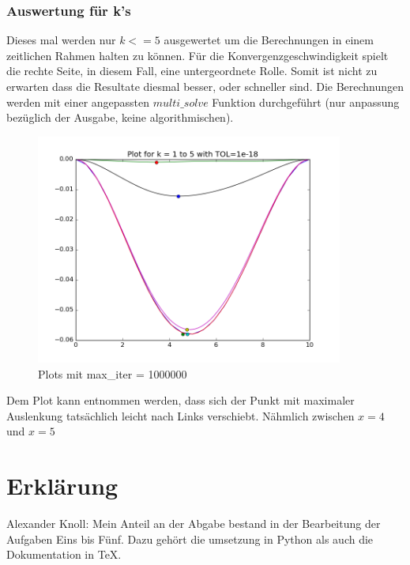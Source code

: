 \documentclass[12pt,titlepage]{article}
\begin{document}
	 	\subsubsection{Auswertung für k's}
	 		Dieses mal werden nur $k<=5$ ausgewertet um die Berechnungen in einem zeitlichen Rahmen halten zu können. Für die Konvergenzgeschwindigkeit spielt die rechte Seite, 
	 		in diesem Fall, eine untergeordnete Rolle. Somit ist nicht zu erwarten dass die Resultate diesmal besser, oder schneller sind. Die Berechnungen werden mit einer
	 		angepassten $multi\_solve$ Funktion durchgeführt (nur anpassung bezüglich der Ausgabe, keine algorithmischen).
		\begin{figure}[H] 
	 		\centering
	 		\includegraphics[width=0.9\textwidth]{extra_k.png}
	 		\caption{Plots mit max\_iter = 1000000}
	 		\label{fig:Bild6}
	 	\end{figure}
	 	Dem Plot kann entnommen werden, dass sich der Punkt mit maximaler Auslenkung tatsächlich leicht nach Links verschiebt. Nähmlich zwischen $x=4$ und $x=5$

\newpage
\section{Erklärung}
	Alexander Knoll: Mein Anteil an der Abgabe bestand in der Bearbeitung der Aufgaben Eins bis Fünf. Dazu gehört die umsetzung in Python als auch die Dokumentation in TeX.

%
%



\end{document}
